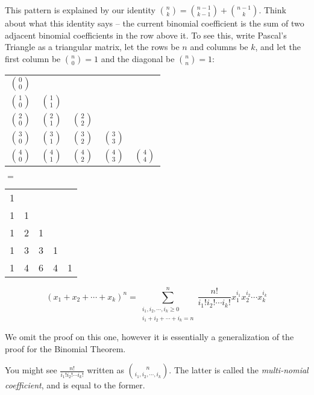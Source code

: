 \documentclass[main.tex]{subfiles}
\begin{document}
This pattern is explained by our identity \(\binom{n}{k} = \binom{n-1}{k-1} + \binom{n-1}{k}\). Think about what this identity says -- the current binomial coefficient is the sum of two adjacent binomial coefficients in the row above it. To see this, write Pascal's Triangle as a triangular matrix, let the rows be \(n\) and columns be \(k\), and let the first column be \(\binom{n}{0} = 1\) and the diagonal be \(\binom{n}{n} = 1\):
\begin{center}
	\bgroup
	\renewcommand{\arraystretch}{1.5}
	\begin{tabular}{ccccc}
		\(\binom{0}{0}\) & & & & \\
		\(\binom{1}{0}\) & \(\binom{1}{1}\) & & & \\
		\(\binom{2}{0}\) & \(\binom{2}{1}\) & \(\binom{2}{2}\) & & \\
		\(\binom{3}{0}\) & \(\binom{3}{1}\) & \(\binom{3}{2}\) & \(\binom{3}{3}\) & \\
		\(\binom{4}{0}\) & \(\binom{4}{1}\) & \(\binom{4}{2}\) & \(\binom{4}{3}\) & \(\binom{4}{4}\) \\
	\end{tabular}
	\hspace{0.5cm}
	\(=\)
	\hspace{0.5cm}
	\begin{tabular}{ccccc}
		1 & & & & \\
		1 & 1 & & & \\
		1 & 2 & 1 & & \\
		1 & 3 & 3 & 1 & \\
		1 & 4 & 6 & 4 & 1 \\
	\end{tabular}
	\egroup
\end{center}

\begin{thm}
	\[(x_1+x_2+\cdots+x_k)^n = \sum_{\substack{i_1, i_2, \cdots, i_k \geq 0 \\ i_1 + i_2 + \cdots + i_k = n}}^{n} \frac{n!}{i_1! i_2! \cdots i_k!} x_1^{i_1} x_2^{i_2} \cdots x_k^{i_k}\]
\end{thm}

We omit the proof on this one, however it is essentially a generalization of the proof for the Binomial Theorem.

\begin{rem}
	You might see \(\frac{n!}{i_1! i_2! \cdots i_k!}\) written as \(\binom{n}{i_1, i_2, \cdots, i_k}\).
	The latter is called the \textit{multi-nomial coefficient}, and is equal to the former.
\end{rem}
\end{document}
